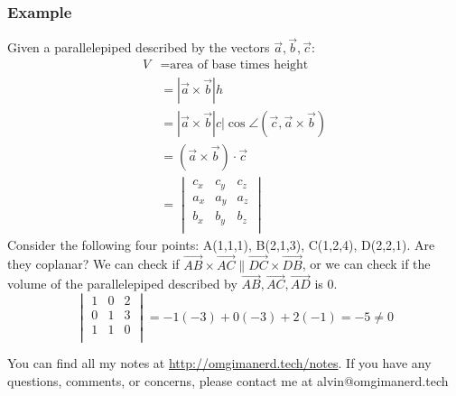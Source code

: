 \documentclass{math}
\begin{document}
\subsubsection*{Example}
Given a parallelepiped described by the vectors \( \vec{a},\vec{b},\vec{c} \):
\begin{align*}
V &= \text{area of base times height} \\
  &= |\vec{a}\times\vec{b}|h \\
  &= |\vec{a}\times\vec{b}|c|\cos\angle(\vec{c},\vec{a}\times\vec{b}) \\
  &= (\vec{a}\times\vec{b})\cdot\vec{c} \\
  &= \begin{vmatrix}
  c_{x} & c_{y} & c_{z} \\
  a_{x} & a_{y} & a_{z} \\
  b_{x} & b_{y} & b_{z} \\
  \end{vmatrix}
\end{align*}
Consider the following four points: A(1,1,1), B(2,1,3), C(1,2,4), D(2,2,1). Are
they coplanar? We can check if \( \vec{AB}\times\vec{AC}\parallel
\vec{DC}\times\vec{DB} \), or we can check if the volume of the parallelepiped
described by \( \vec{AB},\vec{AC},\vec{AD} \) is 0.
\[ \begin{vmatrix}
  1 & 0 & 2 \\
  0 & 1 & 3 \\
  1 & 1 & 0 \\
\end{vmatrix} = -1(-3)+0(-3)+2(-1) = -5 \ne 0 \]

\begin{center}
  You can find all my notes at \url{http://omgimanerd.tech/notes}. If you have
  any questions, comments, or concerns, please contact me at
  alvin@omgimanerd.tech
\end{center}
\end{document}
